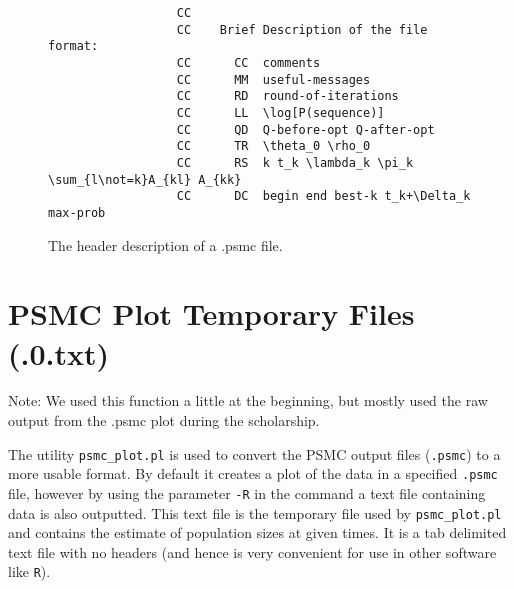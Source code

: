 \documentclass[a4]{article}
\begin{document}
	\begin{figure}[h]
		\begin{lstlisting}
                  CC
                  CC	Brief Description of the file format:
                  CC	  CC  comments
                  CC	  MM  useful-messages
                  CC	  RD  round-of-iterations
                  CC	  LL  \log[P(sequence)]
                  CC	  QD  Q-before-opt Q-after-opt
                  CC	  TR  \theta_0 \rho_0
                  CC	  RS  k t_k \lambda_k \pi_k \sum_{l\not=k}A_{kl} A_{kk}
                  CC	  DC  begin end best-k t_k+\Delta_k max-prob
		\end{lstlisting}
		\caption{The header description of a .psmc file.}\label{psmcHeader}
	\end{figure}

\section{PSMC Plot Temporary Files (.0.txt)}
Note: We used this function a little at the beginning, but mostly used the raw output from the .psmc plot during the scholarship.

	The utility \verb|psmc_plot.pl| is used to convert the PSMC output files (\verb|.psmc|) to a more usable format. By default it creates a plot of the data in a specified \verb|.psmc| file, however by using the parameter \verb|-R| in the command a text file containing data is also outputted. This text file is the temporary file used by \verb|psmc_plot.pl| and contains the estimate of population sizes at given times. It is a tab delimited text file with no headers (and hence is very convenient for use in other software like \verb|R|). 

\appendix
\end{document}
